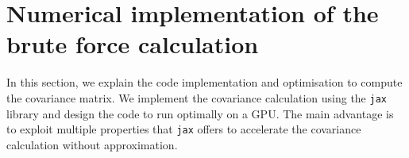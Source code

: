 \documentclass[aps,twocolumn, superscriptaddress, english, nofootinbib, 10pt]{revtex4-2}
\begin{document}



\section{Numerical implementation of the brute force calculation} \label{app:brute_code}
In this section, we explain the code implementation and optimisation to compute the covariance matrix. We implement the covariance calculation using the \texttt{jax} library and design the code to run optimally on a GPU. The main advantage is to exploit multiple properties that \texttt{jax} offers to accelerate the covariance calculation without approximation.
\end{document}
